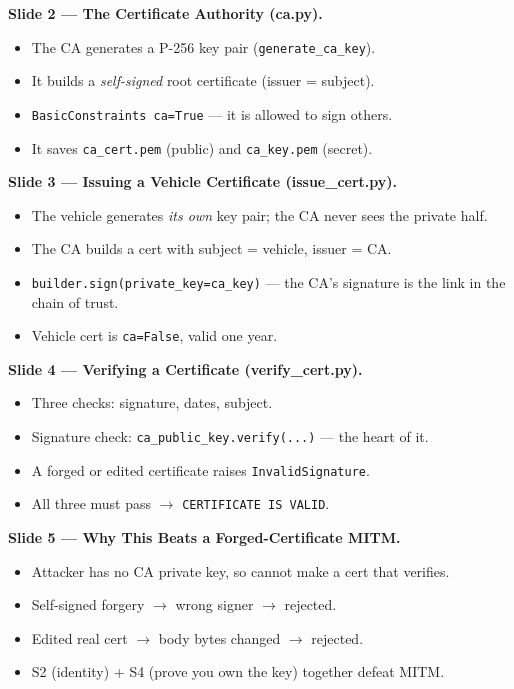 \documentclass[11pt,a4paper]{article}
\begin{document}
\textbf{Slide 2 --- The Certificate Authority (ca.py).}
\begin{itemize}
  \item The CA generates a P-256 key pair (\texttt{generate\_ca\_key}).
  \item It builds a \emph{self-signed} root certificate (issuer = subject).
  \item \texttt{BasicConstraints ca=True} --- it is allowed to sign others.
  \item It saves \texttt{ca\_cert.pem} (public) and \texttt{ca\_key.pem} (secret).
\end{itemize}

\textbf{Slide 3 --- Issuing a Vehicle Certificate (issue\_cert.py).}
\begin{itemize}
  \item The vehicle generates \emph{its own} key pair; the CA never sees the
        private half.
  \item The CA builds a cert with subject = vehicle, issuer = CA.
  \item \texttt{builder.sign(private\_key=ca\_key)} --- the CA's signature is the
        link in the chain of trust.
  \item Vehicle cert is \texttt{ca=False}, valid one year.
\end{itemize}

\textbf{Slide 4 --- Verifying a Certificate (verify\_cert.py).}
\begin{itemize}
  \item Three checks: signature, dates, subject.
  \item Signature check: \texttt{ca\_public\_key.verify(...)} --- the heart of it.
  \item A forged or edited certificate raises \texttt{InvalidSignature}.
  \item All three must pass $\to$ \texttt{CERTIFICATE IS VALID}.
\end{itemize}

\textbf{Slide 5 --- Why This Beats a Forged-Certificate MITM.}
\begin{itemize}
  \item Attacker has no CA private key, so cannot make a cert that verifies.
  \item Self-signed forgery $\to$ wrong signer $\to$ rejected.
  \item Edited real cert $\to$ body bytes changed $\to$ rejected.
  \item S2 (identity) + S4 (prove you own the key) together defeat MITM.
\end{itemize}
\end{document}
